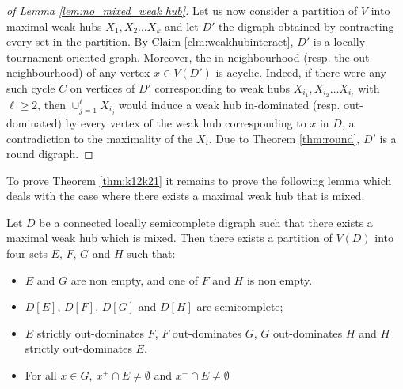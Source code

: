\begin{proof}[of Lemma \ref{lem:no_mixed_weak hub}]
Let us now consider a partition of $V$ into maximal weak hubs $X_{1}, X_{2} \dots X_{k}$ and let $D'$ the digraph obtained by contracting every set in the partition. By Claim \ref{clm:weakhubinteract}, $D'$ is a locally tournament oriented graph. Moreover, the in-neighbourhood (resp. the out-neighbourhood) of any vertex $x \in V(D')$ is acyclic. Indeed, if there were any such cycle $C$ on vertices of $D'$  corresponding to weak hubs $X_{i_{1}}, X_{i_{2}} \dots X_{i_{\ell}}$ with $\ell \geq 2 $, then $\cup_{j=1}^{\ell} X_{i_j}$ would induce a weak hub in-dominated (resp. out-dominated) by every vertex of the weak hub corresponding to $x$ in $D$, a contradiction to the maximality of the $X_i$. Due to Theorem \ref{thm:round}, $D'$ is a round digraph. 
\end{proof}

To prove Theorem \ref{thm:k12k21} it remains to prove the following lemma which deals with the case where there exists a maximal weak hub that is mixed.
\begin{lemma}\label{lem:mixed_weak hub}
Let $D$ be a connected locally semicomplete digraph such that there exists a maximal weak hub which is mixed. Then there exists a partition of $V(D)$ into four sets $E$, $F$, $G$ and $H$ such that:
        \begin{itemize}
            \item $E$ and $G$ are non empty, and one of $F$ and $H$ is non empty.
            \item $D[E]$, $D[F]$, $D[G]$ and $D[H]$ are semicomplete;
            \item $E$ strictly out-dominates $F$, $F$ out-dominates $G$, $G$ out-dominates $H$ and $H$ strictly out-dominates $E$.
                        \item For all $ x\in G,\ x^+\cap E\neq\emptyset$  and $x^-\cap E\neq\emptyset$

        \end{itemize}
\end{lemma}


